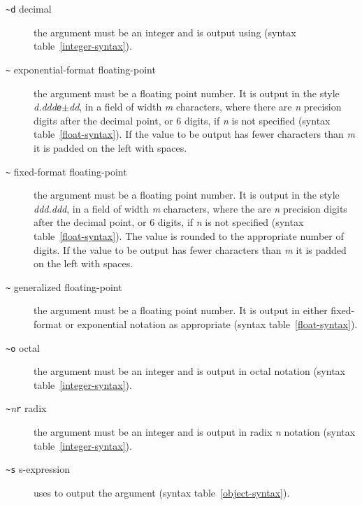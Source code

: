 \begin{optDefinition}
\begin{description}
    \item[{\tt\textasciitilde d} decimal]%
    the argument must be an integer and is output using 
    (syntax table~\ref{integer-syntax}).

    \item[{\tt\textasciitilde}
    exponential-format floating-point]%
    the argument must be a floating point number.  It is output in the style
    \mbox{\em\optional{-}d.ddd{\tt{e}}$\pm$dd}, in a field of width {\em m\/}
    characters, where there are {\em n\/} precision digits after the decimal
    point, or 6 digits, if {\em n\/} is not specified (syntax
    table~\ref{float-syntax}).  If the value to be output has fewer characters
    than {\em m\/} it is padded on the left with spaces.

    \item[{\tt\textasciitilde}
    fixed-format floating-point]%
    the argument must be a floating point number.  It is output in the style
    \mbox{\em\optional{-}ddd.ddd}, in a field of width {\em m\/} characters,
    where the are {\em n\/} precision digits after the decimal point, or 6
    digits, if {\em n\/} is not specified (syntax table~\ref{float-syntax}).
    The value is rounded to the appropriate number of digits.  If the value to
    be output has fewer characters than {\em m\/} it is padded on the left with
    spaces.

    \item[{\tt\textasciitilde}
    generalized floating-point]%
    the argument must be a floating point number.  It is output in either
    fixed-format or exponential notation as appropriate
    (syntax table~\ref{float-syntax}).

    \item[{\tt\textasciitilde o} octal]%
    the argument must be an integer and is output in octal notation
    (syntax table~\ref{integer-syntax}).

    \item[{\tt\textasciitilde}{\em n}{\tt r} radix]%
    the argument must be an integer and is output in radix {\em n\/} notation
    (syntax table~\ref{integer-syntax}).

    \item[{\tt\textasciitilde s} s-expression]%
    uses  to output the argument (syntax
    table~\ref{object-syntax}).


\end{description}
\end{optDefinition}
